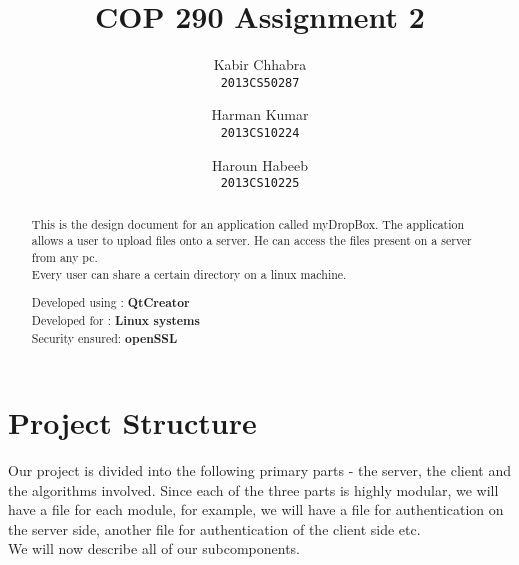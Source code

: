 \documentclass[]{article}
\begin{document}
\author{
  Kabir Chhabra\\
  \texttt{2013CS50287}
  \and
  Harman Kumar\\
  \texttt{2013CS10224}
  \and  
  Haroun Habeeb\\
  \texttt{2013CS10225}
}
\title{COP 290 Assignment 2}
\maketitle



\begin{abstract}
This is the design document for an application called myDropBox. The application allows a user to upload files onto a server. He can access the files present on a server from any pc. \\
Every user can share a certain directory on a linux machine.
\begin{center}
Developed using : \textbf{QtCreator} \\
Developed for   : \textbf{Linux systems}\\
Security ensured: \textbf{openSSL}
\end{center} 
\end{abstract}


\section{\LARGE Project Structure}
Our project is divided into the following primary parts - the server, the client and the algorithms involved.
Since each of the three parts is highly modular, we will have a file for each module, for example, we will have a file for authentication on the server side, another file for authentication of the client side etc. \\
We will now describe all of our subcomponents.
\end{document}
